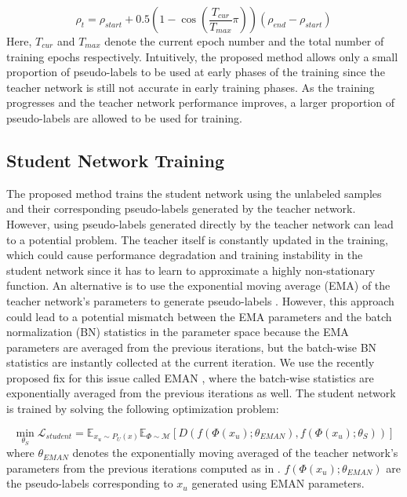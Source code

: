 \documentclass{article}
\begin{document}
\begin{equation}
\label{eqn:rhoo}
  {\rho}_{t} = {\rho}_{start} + 0.5 (1-\cos(\frac{T_{cur}}{T_{max}}\pi )) ({\rho}_{end} - {\rho}_{start})
\end{equation}
Here, $T_{cur}$ and $T_{max}$ denote the current epoch number and the total number of training epochs respectively. Intuitively, the proposed method allows only a small proportion of pseudo-labels to be used at early phases of the training since the teacher network is still not accurate in early training phases. As the training progresses and the teacher network performance improves, a larger proportion of pseudo-labels are allowed to be used for training. 
\par



\subsection{Student Network Training}
The proposed method trains the student network using the unlabeled samples and their corresponding pseudo-labels generated by the teacher network. However, using pseudo-labels generated directly by the teacher network can lead to a potential problem. The teacher itself is constantly updated in the training, which could cause performance degradation and training instability in the student network since it has to learn to approximate a highly non-stationary function. An alternative is to use the exponential moving average (EMA) of the teacher network's parameters to generate pseudo-labels \cite{tarvainen2017mean}. However, this approach could lead to a potential mismatch between the EMA parameters and the batch normalization (BN) statistics in the parameter space  \cite{cai2021exponential} because the EMA parameters are averaged from the previous iterations, but the batch-wise BN statistics are instantly collected at the current iteration. We use the recently proposed fix for this issue called EMAN \cite{cai2021exponential}, where the batch-wise statistics are exponentially averaged from the previous iterations as well. The student network is trained by solving the following optimization problem:

\begin{equation}
  \min_{\theta_S} \mathcal{L}_{student} = \mathbb{E}_{x_u\sim P_U(x)}\mathbb{E}_{\Phi\sim \mathcal{M}}[D(f(\Phi(x_u) ;\theta_{EMAN}),f(\Phi(x_u) ;\theta_S))]
\end{equation}
where $\theta_{EMAN}$ denotes the exponentially moving averaged of the teacher network's parameters from the previous iterations computed as in \cite{cai2021exponential}. $f(\Phi(x_u) ;\theta_{EMAN})$ are the pseudo-labels corresponding to $x_u$ generated using EMAN parameters.
\end{document}
